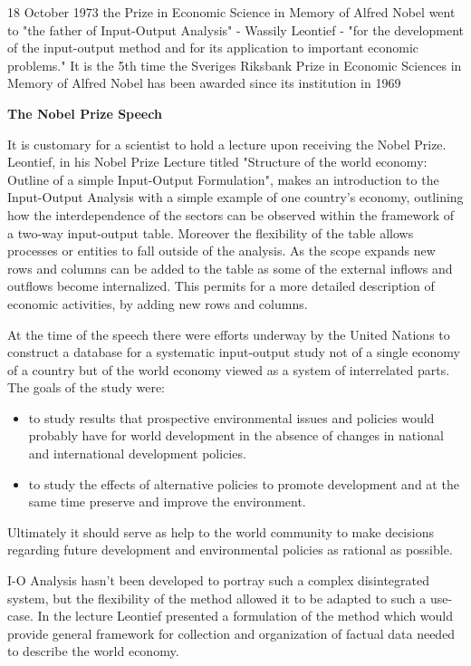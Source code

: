 \documentclass[12pt,a4paper]{scrartcl}
\begin{document}
	18 October 1973 the Prize in Economic Science in Memory of Alfred Nobel went to "the father of Input-Output Analysis" - Wassily Leontief - "for the development of the input-output method and for its application to important economic problems." \cite[]{nobelpress} It is the 5th time the Sveriges Riksbank Prize in Economic Sciences in Memory of Alfred Nobel has been awarded since its institution in 1969
	
	\textbf{The Nobel Prize Speech}
	
	It is customary for a scientist to hold a lecture upon receiving the Nobel Prize. Leontief, in his Nobel Prize Lecture titled "Structure of the world economy: Outline of a simple Input-Output Formulation", makes an introduction to the Input-Output Analysis with a simple example of one country's economy, outlining how the interdependence of the sectors can be observed within the framework of a two-way input-output table. Moreover the flexibility of the table allows processes or entities to fall outside of the analysis. As the scope expands new rows and columns can be added to the table as some of the external inflows and outflows become internalized. This permits for a more detailed description of economic activities, by adding new rows and columns.
	
	At the time of the speech there were efforts underway by the United Nations to construct a database for a systematic input-output study not of a single economy of a country but of the world economy viewed as a system of interrelated parts. The goals of the study were:
	
	\begin{itemize}
		\item  to study results that prospective environmental issues and policies would probably have for world development in the absence of changes in national and international development policies.
		\item to study the effects of alternative policies to promote development and at the same time preserve and improve the environment.
	\end{itemize}

	Ultimately it should serve as help to the world community to make decisions regarding future development and environmental policies as rational as possible.
	
	I-O Analysis hasn't been developed to portray such a complex disintegrated system, but the flexibility of the method allowed it to be adapted to such a use-case. In the lecture Leontief presented a formulation of the method which would provide general framework for collection and organization of factual data needed to describe the world economy.
	
\end{document}

